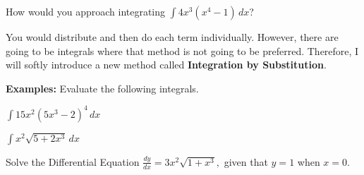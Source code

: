 How would you approach integrating $\displaystyle\int 4x^3\left(x^4-1\right)\,dx$?

You would distribute and then do each term individually. However, there are going to be integrals where that method is not going to be preferred. Therefore, I will softly introduce a new method called \textbf{Integration by Substitution}.

\noindent\textbf{Examples:} Evaluate the following integrals.
\begin{questions}
    \question $\displaystyle\int15x^2(5x^3-2)^4\,dx$
    
    \question $\displaystyle\int x^2\sqrt{5+2x^3}\,dx$
    
    Solve the Differential Equation
    \question $\displaystyle\frac{dy}{dx}=3x^2\sqrt{1+x^3},$ given that $y=1$ when $x=0$.
\end{questions}



\newpage
